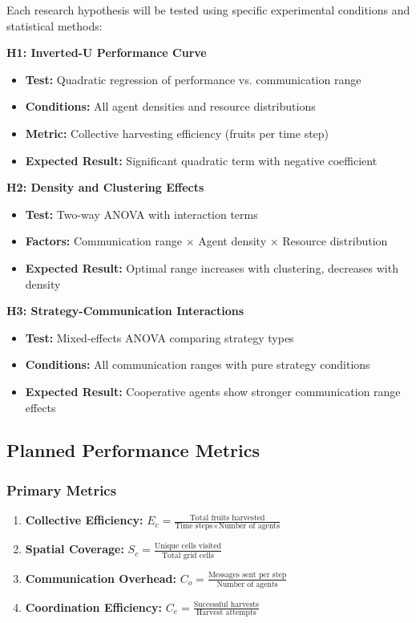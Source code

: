 \documentclass[12pt,a4paper]{article}
\begin{document}
Each research hypothesis will be tested using specific experimental conditions and statistical methods:

\textbf{H1: Inverted-U Performance Curve}
\begin{itemize}
    \item \textbf{Test:} Quadratic regression of performance vs. communication range
    \item \textbf{Conditions:} All agent densities and resource distributions
    \item \textbf{Metric:} Collective harvesting efficiency (fruits per time step)
    \item \textbf{Expected Result:} Significant quadratic term with negative coefficient
\end{itemize}

\textbf{H2: Density and Clustering Effects}
\begin{itemize}
    \item \textbf{Test:} Two-way ANOVA with interaction terms
    \item \textbf{Factors:} Communication range × Agent density × Resource distribution
    \item \textbf{Expected Result:} Optimal range increases with clustering, decreases with density
\end{itemize}

\textbf{H3: Strategy-Communication Interactions}
\begin{itemize}
    \item \textbf{Test:} Mixed-effects ANOVA comparing strategy types
    \item \textbf{Conditions:} All communication ranges with pure strategy conditions
    \item \textbf{Expected Result:} Cooperative agents show stronger communication range effects
\end{itemize}

\subsection{Planned Performance Metrics}

\subsubsection{Primary Metrics}

\begin{enumerate}
    \item \textbf{Collective Efficiency:} $E_c = \frac{\text{Total fruits harvested}}{\text{Time steps} \times \text{Number of agents}}$

    \item \textbf{Spatial Coverage:} $S_c = \frac{\text{Unique cells visited}}{\text{Total grid cells}}$

    \item \textbf{Communication Overhead:} $C_o = \frac{\text{Messages sent per step}}{\text{Number of agents}}$

    \item \textbf{Coordination Efficiency:} $C_e = \frac{\text{Successful harvests}}{\text{Harvest attempts}}$
\end{enumerate}
\end{document}
